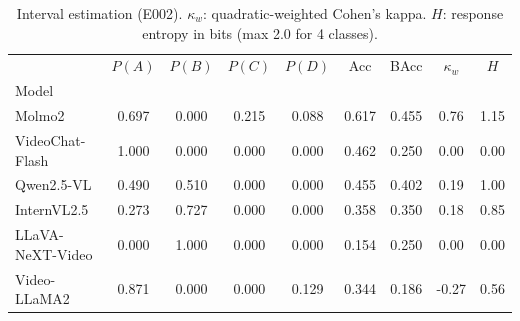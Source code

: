 \begin{table}[t]
\centering
\small
\caption{Interval estimation (E002). $\kappa_w$: quadratic-weighted Cohen's kappa. $H$: response entropy in bits (max 2.0 for 4 classes).}
\label{tab:interval}
\begin{tabular}{lcccccccc}
\toprule
 & $P(A)$ & $P(B)$ & $P(C)$ & $P(D)$ & Acc & BAcc & $\kappa_w$ & $H$ \\
Model &  &  &  &  &  &  &  &  \\
\midrule
Molmo2 & 0.697 & 0.000 & 0.215 & 0.088 & 0.617 & 0.455 & 0.76 & 1.15 \\
VideoChat-Flash & 1.000 & 0.000 & 0.000 & 0.000 & 0.462 & 0.250 & 0.00 & 0.00 \\
Qwen2.5-VL & 0.490 & 0.510 & 0.000 & 0.000 & 0.455 & 0.402 & 0.19 & 1.00 \\
InternVL2.5 & 0.273 & 0.727 & 0.000 & 0.000 & 0.358 & 0.350 & 0.18 & 0.85 \\
LLaVA-NeXT-Video & 0.000 & 1.000 & 0.000 & 0.000 & 0.154 & 0.250 & 0.00 & 0.00 \\
Video-LLaMA2 & 0.871 & 0.000 & 0.000 & 0.129 & 0.344 & 0.186 & -0.27 & 0.56 \\
\bottomrule
\end{tabular}
\end{table}
